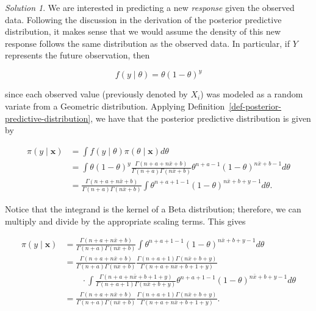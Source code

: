 \documentclass[
  letterpaper,
  DIV=11,
  numbers=noendperiod]{scrreprt}
\theoremstyle{definition}
\theoremstyle{definition}
\theoremstyle{plain}
\theoremstyle{remark}
\newtheorem*{solution}{Solution}
\begin{document}
\begin{solution}

We are interested in predicting a new \emph{response} given the observed
data. Following the discussion in the derivation of the posterior
predictive distribution, it makes sense that we would assume the density
of this new response follows the same distribution as the observed data.
In particular, if \(Y\) represents the future observation, then

\[f(y \mid \theta) = \theta (1 - \theta)^y\]

since each observed value (previously denoted by \(X_i\)) was modeled as
a random variate from a Geometric distribution. Applying
Definition~\ref{def-posterior-predictive-distribution}, we have that the
posterior predictive distribution is given by

\[
\begin{aligned}
  \pi(y \mid \mathbf{x})
    &= \int f\left(y \mid \theta\right) \pi(\theta \mid \mathbf{x}) d\theta \\
    &= \int \theta (1 - \theta)^y \frac{\Gamma(n + a + n\bar{x} + b)}{\Gamma(n + a) \Gamma(n\bar{x} + b)} \theta^{n + a - 1} (1 - \theta)^{n\bar{x} + b - 1} d\theta \\
    &= \frac{\Gamma(n + a + n\bar{x} + b)}{\Gamma(n + a) \Gamma(n\bar{x} + b)} \int \theta^{n + a + 1 - 1} (1 - \theta)^{n\bar{x} + b + y - 1} d\theta. 
\end{aligned}
\]

Notice that the integrand is the kernel of a Beta distribution;
therefore, we can multiply and divide by the appropriate scaling terms.
This gives

\[
\begin{aligned}
  \pi(y \mid \mathbf{x})
    &= \frac{\Gamma(n + a + n\bar{x} + b)}{\Gamma(n + a) \Gamma(n\bar{x} + b)} \int \theta^{n + a + 1 - 1} (1 - \theta)^{n\bar{x} + b + y - 1} d\theta \\
    &= \frac{\Gamma(n + a + n\bar{x} + b)}{\Gamma(n + a) \Gamma(n\bar{x} + b)} \frac{\Gamma(n + a + 1) \Gamma(n\bar{x} + b + y)}{\Gamma(n + a + n\bar{x} + b + 1 + y)} \\
    &\qquad \cdot \int \frac{\Gamma(n + a + n\bar{x} + b + 1 + y)}{\Gamma(n + a + 1) \Gamma(n\bar{x} + b + y)} \theta^{n + a + 1 - 1} (1 - \theta)^{n\bar{x} + b + y - 1} d\theta \\
    &= \frac{\Gamma(n + a + n\bar{x} + b)}{\Gamma(n + a) \Gamma(n\bar{x} + b)} \frac{\Gamma(n + a + 1) \Gamma(n\bar{x} + b + y)}{\Gamma(n + a + n\bar{x} + b + 1 + y)}.
\end{aligned}
\]


\end{solution}
\end{document}
